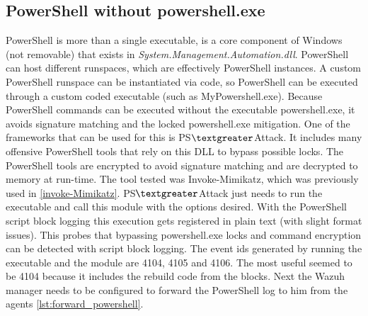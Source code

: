 \subsection{PowerShell without powershell.exe}
PowerShell is more than a single executable, is a core component of Windows (not removable) that exists in \textit{System.Management.Automation.dll}.
PowerShell can host different runspaces, which are effectively PowerShell instances.
A custom PowerShell runspace can be instantiated via code, so PowerShell can be executed through a custom coded executable (such as MyPowershell.exe).
\linej
Because PowerShell commands can be executed without the executable powershell.exe, it avoids signature matching and the locked powershell.exe mitigation\cite{powershell_adsecurity}.
\linej
\linej
One of the frameworks that can be used for this is PS$\textgreater$Attack\cite{PSAttack}.
It includes many offensive PowerShell tools that rely on this DLL to bypass possible locks.
The PowerShell tools are encrypted to avoid signature matching and are decrypted to memory at run-time\cite{powershell_adsecurity}.
\linej
The tool tested was Invoke-Mimikatz, which was previously used in \ref{invoke-Mimikatz}.
\linej
PS$\textgreater$Attack just needs to run the executable and call this module with the options desired.
\linej
\linej
With the PowerShell script block logging this execution gets registered in plain text (with slight format issues).
This probes that bypassing powershell.exe locks and command encryption can be detected with script block logging.
The event ids generated by running the executable and the module are 4104, 4105 and 4106. The most useful seemed to be 4104 because it includes the rebuild code from the blocks.
\linej
\linej
Next the Wazuh manager needs to be configured to forward the PowerShell log to him from the agents \ref{lst:forward_powershell}.
